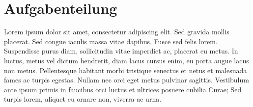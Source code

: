 \section{Aufgabenteilung}

Lorem ipsum dolor sit amet, consectetur adipiscing elit. Sed gravida mollis placerat. Sed congue iaculis massa vitae dapibus. Fusce sed felis lorem. Suspendisse purus diam, sollicitudin vitae imperdiet ac, placerat eu metus. In luctus, metus vel dictum hendrerit, diam lacus cursus enim, eu porta augue lacus non metus. Pellentesque habitant morbi tristique senectus et netus et malesuada fames ac turpis egestas. Nullam nec orci eget metus pulvinar sagittis. Vestibulum ante ipsum primis in faucibus orci luctus et ultrices posuere cubilia Curae; Sed turpis lorem, aliquet eu ornare non, viverra ac urna.